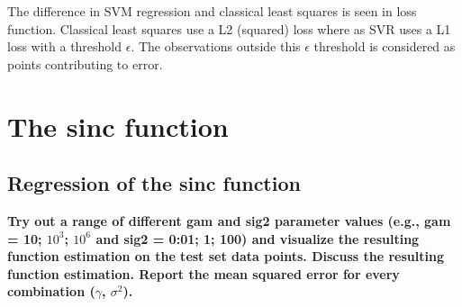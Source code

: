 The difference in SVM regression and classical least squares is seen in loss function. Classical least squares use a L2 (squared) loss where as SVR uses a L1 loss with a threshold $\epsilon$. The observations outside this $\epsilon$ threshold is considered as points contributing to error.
\section{The sinc function}
\subsection{Regression of the sinc function}
\textbf{Try out a range of different gam and sig2 parameter values (e.g., gam = 10; $10^3$; $10^6$
	and sig2 = 0:01; 1; 100) and visualize the resulting function estimation on the test
	set data points. Discuss the resulting function estimation. Report the mean squared
	error for every combination ($\gamma$, $\sigma^2$).}

